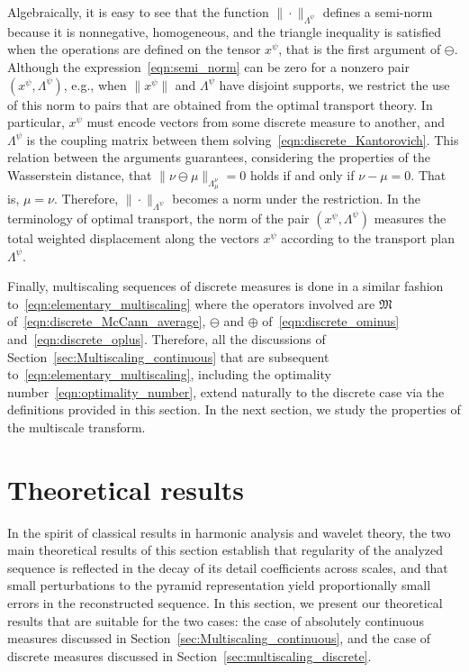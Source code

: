 \documentclass[12pt]{amsart}
\begin{document}
Algebraically, it is easy to see that the function $\|\cdot \|_{\Lambda^\psi}$ defines a semi-norm because it is nonnegative, homogeneous, and the triangle inequality is satisfied when the operations are defined on the tensor $x^\psi$, that is the first argument of $\ominus$. Although the expression~\eqref{eqn:semi_norm} can be zero for a nonzero pair $(x^\psi, \Lambda^\psi)$, e.g., when $\|x^\psi\|$ and $\Lambda^\psi$ have disjoint supports, we restrict the use of this norm to pairs that are obtained from the optimal transport theory. In particular, $x^\psi$ must encode vectors from some discrete measure to another, and $\Lambda^\psi$ is the coupling matrix between them solving~\eqref{eqn:discrete_Kantorovich}. This relation between the arguments guarantees, considering the properties of the Wasserstein distance, that $\|\nu\ominus\mu\|_{\Lambda_\mu^\nu}=0$ holds if and only if $\nu-\mu=0$. That is, $\mu=\nu$. Therefore, $\|\cdot\|_{\Lambda^\psi}$ becomes a norm under the restriction. In the terminology of optimal transport, the norm of the pair $(x^\psi,\Lambda^\psi)$ measures the total weighted displacement along the vectors $x^\psi$ according to the transport plan $\Lambda^\psi$.

Finally, multiscaling sequences of discrete measures is done in a similar fashion to~\eqref{eqn:elementary_multiscaling} where the operators involved are $\mathfrak{M}$ of~\eqref{eqn:discrete_McCann_average}, $\ominus$ and $\oplus$ of~\eqref{eqn:discrete_ominus} and~\eqref{eqn:discrete_oplus}. Therefore, all the discussions of Section~\ref{sec:Multiscaling_continuous} that are subsequent to~\eqref{eqn:elementary_multiscaling}, including the optimality number~\eqref{eqn:optimality_number}, extend naturally to the discrete case via the definitions provided in this section. In the next section, we study the properties of the multiscale transform.

\section{Theoretical results}\label{sec:theoretical_results}

In the spirit of classical results in harmonic analysis and wavelet theory, the two main theoretical results of this section establish that regularity of the analyzed sequence is reflected in the decay of its detail coefficients across scales, and that small perturbations to the pyramid representation yield proportionally small errors in the reconstructed sequence. In this section, we present our theoretical results that are suitable for the two cases: the case of absolutely continuous measures discussed in Section~\ref{sec:Multiscaling_continuous}, and the case of discrete measures discussed in Section~\ref{sec:multiscaling_discrete}. 
\end{document}

